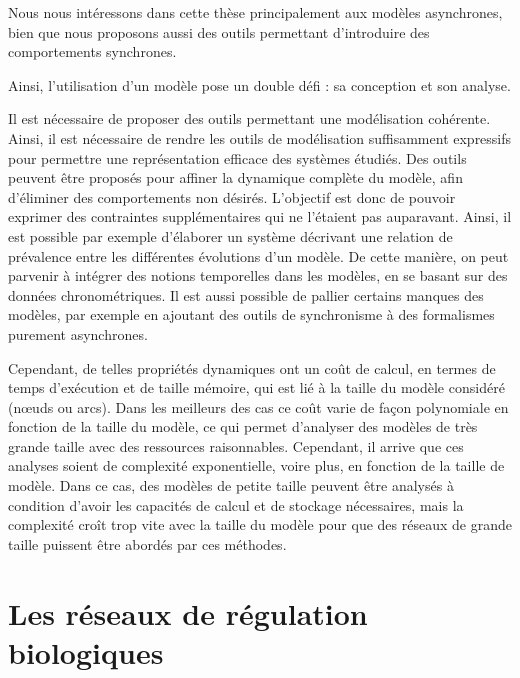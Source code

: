 Nous nous intéressons dans cette thèse principalement aux modèles asynchrones,
bien que nous proposons aussi des outils permettant d'introduire des comportements synchrones.

Ainsi, l'utilisation d'un modèle pose un double défi : sa conception et son analyse.

Il est nécessaire de proposer des outils permettant une modélisation cohérente.
Ainsi, il est nécessaire de rendre les outils de modélisation suffisamment expressifs pour
permettre une représentation efficace des systèmes étudiés.
Des outils peuvent être proposés pour affiner la dynamique complète du modèle,
afin d'éliminer des comportements non désirés.
L'objectif est donc de pouvoir exprimer des contraintes supplémentaires
qui ne l'étaient pas auparavant.
Ainsi, il est possible par exemple
d'élaborer un système décrivant une relation de prévalence entre les
différentes évolutions d'un modèle.
De cette manière, on peut parvenir à intégrer des notions temporelles dans les modèles,
en se basant sur des données chronométriques.
Il est aussi possible de pallier certains manques des modèles,
par exemple en ajoutant des outils de synchronisme à des formalismes purement asynchrones.

Cependant, de telles propriétés dynamiques ont un coût de calcul,
en termes de temps d'exécution et de taille mémoire,
qui est lié à la taille du modèle considéré (nœuds ou arcs).
Dans les meilleurs des cas ce coût varie de façon polynomiale en fonction de la taille du modèle,
ce qui permet d'analyser des modèles de très grande taille avec des ressources raisonnables.
Cependant, il arrive que ces analyses soient de complexité exponentielle, voire plus,
en fonction de la taille de modèle.
Dans ce cas, des modèles de petite taille peuvent être analysés à condition d'avoir
les capacités de calcul et de stockage nécessaires,
mais la complexité croît trop vite avec la taille du modèle pour que
des réseaux de grande taille puissent être abordés par ces méthodes.




\section{Les réseaux de régulation biologiques}


